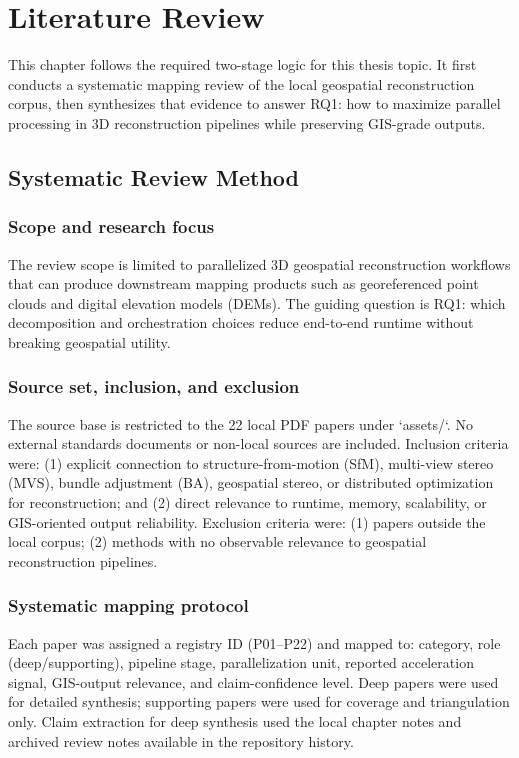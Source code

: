 \chapter{Literature Review}\label{chap:survey}

This chapter follows the required two-stage logic for this thesis topic. It first conducts a systematic mapping review of the local geospatial reconstruction corpus, then synthesizes that evidence to answer RQ1: how to maximize parallel processing in 3D reconstruction pipelines while preserving GIS-grade outputs.

\section{Systematic Review Method}

\subsection{Scope and research focus}

The review scope is limited to parallelized 3D geospatial reconstruction workflows that can produce downstream mapping products such as georeferenced point clouds and digital elevation models (DEMs). The guiding question is RQ1: which decomposition and orchestration choices reduce end-to-end runtime without breaking geospatial utility.

\subsection{Source set, inclusion, and exclusion}

The source base is restricted to the 22 local PDF papers under `assets/`. No external standards documents or non-local sources are included. Inclusion criteria were: (1) explicit connection to structure-from-motion (SfM), multi-view stereo (MVS), bundle adjustment (BA), geospatial stereo, or distributed optimization for reconstruction; and (2) direct relevance to runtime, memory, scalability, or GIS-oriented output reliability. Exclusion criteria were: (1) papers outside the local corpus; (2) methods with no observable relevance to geospatial reconstruction pipelines.

\subsection{Systematic mapping protocol}

Each paper was assigned a registry ID (P01--P22) and mapped to: category, role (deep/supporting), pipeline stage, parallelization unit, reported acceleration signal, GIS-output relevance, and claim-confidence level. Deep papers were used for detailed synthesis; supporting papers were used for coverage and triangulation only. Claim extraction for deep synthesis used the local chapter notes and archived review notes available in the repository history.

